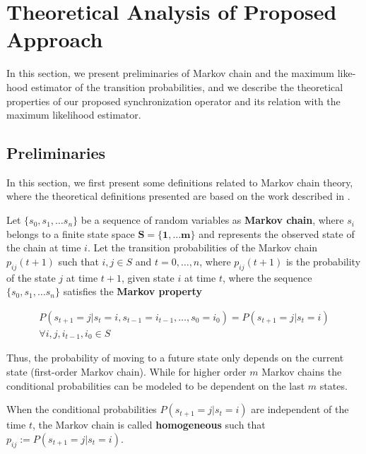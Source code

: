 \section{Theoretical Analysis of Proposed Approach}
 In this section, we present preliminaries of Markov chain and the maximum like-hood estimator of the transition probabilities, and we describe the theoretical properties of our proposed synchronization operator and its relation with the maximum likelihood estimator. 
 
 
 \subsection*{Preliminaries}
 In this section, we first present some definitions related to Markov chain theory, 
where the theoretical definitions presented  are based 
on the work described in \cite{bertsekas2002introduction,Billingsley1961,anderson1957statistical,howard2012dynamic}.

\begin{definition}
	Let $\{s_0, s_1, \ldots s_n\}$ be a sequence of random variables as \textbf{Markov chain}, where $s_i$ belongs to a finite state space $\mathbf{S =\{1,\ldots m\}}$ and represents the observed state of the chain at time $i$. Let the transition probabilities of the Markov chain $p_{ij}(t+1)$ such that $i,j \in S$ and $t=0,\ldots, n$, where  $p_{ij}(t+1)$ is the probability of the state $j$ at time $t+1$, given state $i$ at time $t$, where the sequence $\{s_0, s_1, \ldots s_n\}$ satisfies the \textbf{Markov property} 
	
	\begin{equation}
	\begin{aligned}
	P(s_{t+1}=j|s_{t}=i,s_{t-1}=i_{t-1},\ldots ,s_{0}=i_{0})=P(s_{t+1}=j|s_{t}=i)\\
	\forall i,j,i_{t-1},i_{0} \in S
	\end{aligned}
	\end{equation}

	
	Thus, the probability of moving to a future state only depends on the current  state (first-order Markov chain). While for higher order $m$ Markov chains the conditional probabilities can be modeled to be dependent on the last $m$ states. 
	
	When the conditional probabilities $P(s_{t+1}=j|s_{t}=i)$ are independent of the time $t$, the Markov chain is called \textbf{homogeneous} such that $p_{ij}:=P(s_{t+1}=j|s_{t}=i)$.
	

	
\end{definition}

